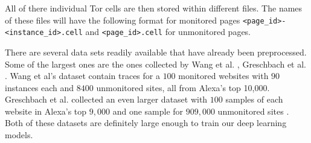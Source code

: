 All of there individual Tor cells are then stored within different files.
The names of these files will have the following format for monitored pages \texttt{<page\_id>-<instance\_id>.cell} and \texttt{<page\_id>.cell} for unmonitored pages.

There are several data sets readily available that have already been preprocessed.
Some of the largest ones are the ones collected by Wang et al. \cite{wang_cai_johnson_nithyanand_goldberg_2014}, Greschbach et al. \cite{greschbach2016effect}.
Wang et al's dataset contain traces for a $100$ monitored websites with $90$ instances each and $8400$ unmonitored sites, all from Alexa's top 10,000.
Greschbach et al. collected an even larger dataset with $100$ samples of each website in Alexa's top $9,000$ and one sample for $909,000$ unmonitored sites \cite{greschbach2016effect}.
Both of these datasets are definitely large enough to train our deep learning models.
